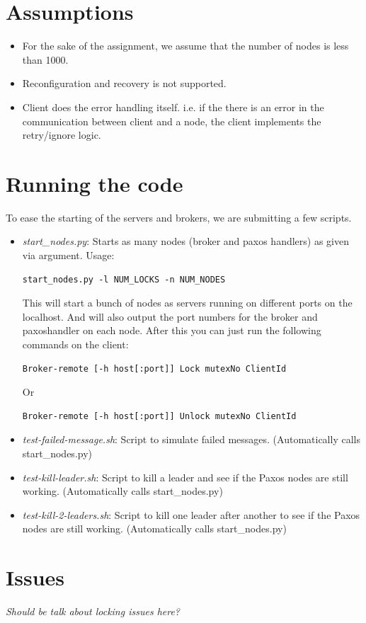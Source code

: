 \documentclass[letterpaper]{article}
\begin{document}
\section{Assumptions}
\begin{itemize}
\item For the sake of the assignment, we assume that the number of nodes is less than 1000.
\item Reconfiguration and recovery is not supported.
\item Client does the error handling itself. i.e. if the there is an error in the communication between client and a node, the client implements the retry/ignore logic.
\end{itemize}
\section{Running the code}
To ease the starting of the servers and brokers, we are submitting a few scripts.
\begin{itemize}
\item {\em start\_nodes.py}: Starts as many nodes (broker and paxos handlers) as given via argument. Usage:
\begin{verbatim}
start_nodes.py -l NUM_LOCKS -n NUM_NODES
\end{verbatim}
This will start a bunch of nodes as servers running on different ports on the localhost. And will also output the port numbers for the broker and paxoshandler on each node. After this you can just run the following commands on the client:
\begin{verbatim}
Broker-remote [-h host[:port]] Lock mutexNo ClientId
\end{verbatim}
Or
\begin{verbatim}
Broker-remote [-h host[:port]] Unlock mutexNo ClientId
\end{verbatim}

\item {\em test-failed-message.sh}: Script to simulate failed messages. (Automatically calls start\_nodes.py)
\item {\em test-kill-leader.sh}: Script to kill a leader and see if the Paxos nodes are still working. (Automatically calls start\_nodes.py)
\item {\em test-kill-2-leaders.sh}: Script to kill one leader after another to see if the Paxos nodes are still working. (Automatically calls start\_nodes.py)

\end{itemize}
\section{Issues}
\emph{Should be talk about locking issues here?}
\end{document}
